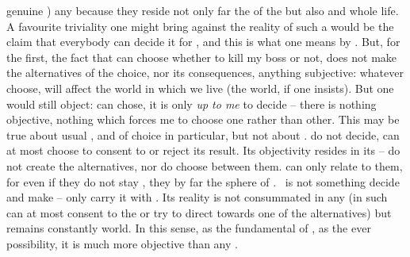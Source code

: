 genuine \sch) any  because they reside not only far 
the  of the  but also  and
 whole life. A favourite triviality one might bring against the reality of
such a  would be the claim that everybody can decide it for ,
and this is what one means by . But, for the first, the fact that
 can choose whether to kill my boss or not, does not make the alternatives
of the choice, nor its consequences, anything subjective: whatever 
choose, will affect the world in which we live (the  world, if one
insists).  But one would still object:  can chose, it is only {\em up to
  me} to decide -- there is nothing {objective}, nothing  which
forces me to choose one rather than other. This may be true about usual
, and  of choice in particular, but not about \sch.  do
not decide,  can at most choose to consent to or reject its result. Its
{objectivity} resides in its  --  do not create the
alternatives, nor do  choose between them.  can only relate
to them, for even if they do not stay  , they by
far  the sphere of .   \Sch\ is not
something  decide and make --  only carry it with . Its
reality is not consummated in any  (in such   can
at most  consent to the  or try to direct
 towards one of the alternatives) but remains constantly 
 world. In this sense, as the fundamental  of ,
as the ever  possibility, it is much more {objective} than any
.
%


